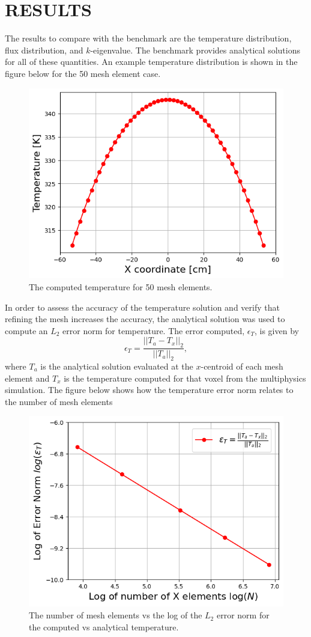 \documentclass[letterpaper]{mc2023}
\begin{document}
\section{RESULTS}\label{sec:results}
The results to compare with the benchmark are the temperature distribution, flux distribution, and $k$-eigenvalue. The benchmark provides
analytical solutions for all of these quantities. An example temperature distribution is shown in the figure below for the 50 mesh element case.
\begin{figure}[H]
    \centering
    \includegraphics[width=0.55\linewidth]{figures/temp_50.png}
    \caption{The computed temperature for 50 mesh elements.}
    \label{fig:temp50}
\end{figure}
In order to assess the accuracy of the temperature solution and verify that refining the mesh increases the accuracy, the analytical solution
was used to compute an $L_{2}$ error norm for temperature. The error computed, $\epsilon_{T}$, is given by
\begin{equation}
    \epsilon_{T} = \frac{|| T_{a} - T_{x} ||_{2}}{|| T_{a} ||_{2}},
\end{equation}
where $T_{a}$ is the analytical solution evaluated at the $x$-centroid of each mesh element and $T_{x}$ is the temperature computed for that
voxel from the multiphysics simulation. The figure below shows how the temperature error norm relates to the number of mesh elements
\begin{figure}[H]
    \centering
    \includegraphics[width=0.55\linewidth]{figures/temp_error_norms.png}
    \caption{The number of mesh elements vs the log of the $L_{2}$ error norm for the computed vs analytical temperature.}
    \label{fig:temp_error_study}
\end{figure}
\end{document}
